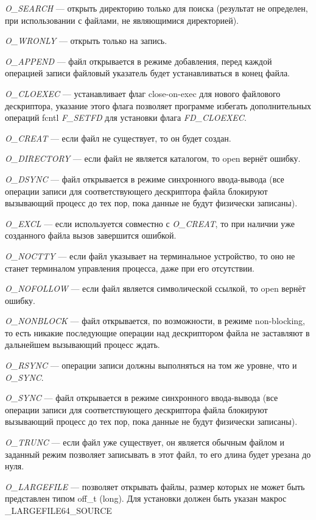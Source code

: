 \textit{O\_SEARCH} — открыть директорию только для поиска (результат не определен, при использовании с файлами, не являющимися директорией).

\textit{O\_WRONLY} — открыть только на запись.

\textit{O\_APPEND} — файл открывается в режиме добавления, перед каждой операцией записи файловый указатель будет устанавливаться в конец файла.

\textit{O\_CLOEXEC} — устанавливает флаг close-on-exec для нового файлового дескриптора, указание этого флага позволяет программе избегать дополнительных операций fcntl \textit{F\_SETFD} для установки флага \textit{FD\_CLOEXEC}.

\textit{O\_CREAT} — если файл не существует, то он будет создан.

\textit{O\_DIRECTORY} — если файл не является каталогом, то open вернёт ошибку.

\textit{O\_DSYNC} — файл открывается в режиме синхронного ввода-вывода (все операции записи для соответствующего дескриптора файла блокируют вызывающий процесс до тех пор, пока данные не будут физически записаны).

\textit{O\_EXCL} — если используется совместно с \textit{O\_CREAT}, то при наличии уже созданного файла вызов завершится ошибкой.

\textit{O\_NOCTTY} — если файл указывает на терминальное устройство, то оно не станет терминалом управления процесса, даже при его отсутствии.

\textit{O\_NOFOLLOW} — если файл является символической ссылкой, то open вернёт ошибку.

\textit{O\_NONBLOCK} — файл открывается, по возможности, в режиме non-blocking, то есть никакие последующие операции над дескриптором файла не заставляют в дальнейшем вызывающий процесс ждать.

\textit{O\_RSYNC} — операции записи должны выполняться на том же уровне, что и \textit{O\_SYNC}.

\textit{O\_SYNC} — файл открывается в режиме синхронного ввода-вывода (все операции записи для соответствующего дескриптора файла блокируют вызывающий процесс до тех пор, пока данные не будут физически записаны).

\textit{O\_TRUNC} — если файл уже существует, он является обычным файлом и заданный режим позволяет записывать в этот файл, то его длина будет урезана до нуля.

\textit{O\_LARGEFILE} — позволяет открывать файлы, размер которых не может быть представлен типом off\_t (long). Для установки должен быть указан макрос \_LARGEFILE64\_SOURCE

